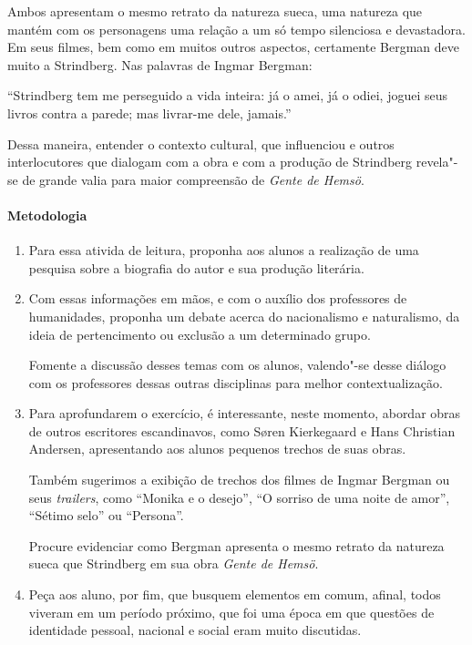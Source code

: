\documentclass[12pt]{extarticle}
\begin{document}
Ambos apresentam o mesmo retrato da natureza sueca, uma natureza que mantém com os personagens uma 
relação a um só tempo silenciosa e devastadora. Em seus filmes, bem como em
muitos outros aspectos, certamente Bergman deve muito a
Strindberg. Nas palavras de Ingmar Bergman: 

``Strindberg tem me perseguido a vida inteira: já o
amei, já o odiei, joguei seus livros contra a
parede; mas livrar-me dele, jamais.''

Dessa maneira, entender o contexto cultural, que influenciou  e outros interlocutores que dialogam com 
a obra e com a produção de Strindberg revela"-se de grande valia para maior compreensão de 
\emph{Gente de Hemsö}.


\paragraph{Metodologia}

\begin{enumerate}

\item
Para essa ativida de leitura, proponha aos alunos a realização de uma pesquisa sobre 
a biografia do autor e sua produção literária. 

\item
Com essas informações em mãos, e com o auxílio dos professores de
humanidades, proponha um debate acerca do nacionalismo e naturalismo, da ideia de
pertencimento ou exclusão a um determinado grupo.

Fomente a discussão desses temas com os
alunos, valendo"-se desse diálogo com os professores dessas outras disciplinas para 
melhor contextualização. 

\item
Para aprofundarem o exercício, é interessante, neste momento, abordar obras de outros escritores
escandinavos, como Søren Kierkegaard e Hans Christian Andersen,
apresentando aos alunos pequenos trechos de suas obras.

Também sugerimos a exibição de trechos dos filmes de Ingmar Bergman ou seus \textit{trailers}, 
como ``Monika e o desejo'', ``O sorriso de uma noite de amor'', ``Sétimo selo'' ou ``Persona''. 

Procure evidenciar como Bergman apresenta o mesmo retrato da natureza sueca que Strindberg em sua obra 
\emph{Gente de Hemsö}. 

\item
Peça aos aluno, por fim, que busquem elementos em comum, afinal, todos viveram em um período próximo, 
que foi uma época em que questões de identidade pessoal, nacional e social eram muito discutidas.

\end{enumerate}
\end{document}
